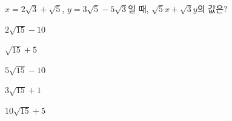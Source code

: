 $x=2\sqrt{3}+\sqrt{5}$, $y=3\sqrt{5}-5\sqrt{3}$일 때, $\sqrt{5}x+\sqrt{3}y$의 값은?
\begin{choicesii}{\rule[-3ex]{0pt}{8ex}$2\sqrt{15}-10$}{\rule[-3ex]{0pt}{8ex}$\sqrt{15}+5$}{\rule[-3ex]{0pt}{8ex}$5\sqrt{15}-10$}{\rule[-3ex]{0pt}{8ex}$3\sqrt{15}+1$}{\rule[-3ex]{0pt}{8ex}$10\sqrt{15}+5$}\end{choicesii}
